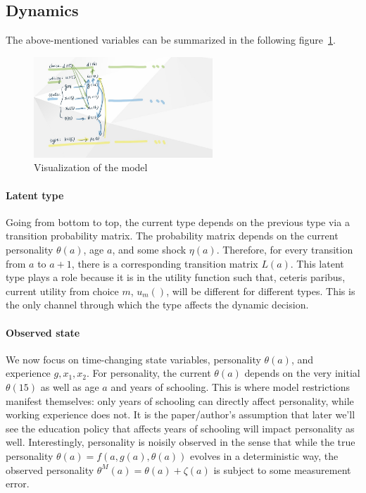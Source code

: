 \documentclass[12pt]{article}
\begin{document}
\subsection{Dynamics}
The above-mentioned variables can be summarized in the following figure~\ref{fig:viz}.

\begin{figure}[!htbp]
\centering
\includegraphics[width=0.6\textwidth]{../Figures/viz.jpg}
\caption{Visualization of the model}
\label{fig:viz}
\end{figure}

\paragraph{Latent type} Going from bottom to top, the current type depends on the previous type via a transition probability matrix. The probability matrix depends on the current personality $\theta(a)$, age $a$, and some shock $\eta(a)$. Therefore, for every transition from $a$ to $a+1$, there is a corresponding transition matrix $L(a)$. This latent type plays a role because it is in the utility function such that, ceteris paribus, current utility from choice $m$, $u_m()$, will be different for different types. This is the only channel through which the type affects the dynamic decision.

\paragraph{Observed state} We now focus on time-changing state variables, personality $\theta(a)$, and experience $g, x_1, x_2$. For personality, the current $\theta(a)$ depends on the very initial $\theta(15)$ as well as age $a$ and years of schooling. This is where model restrictions manifest themselves: only years of schooling can directly affect personality, while working experience does not. It is the paper/author's assumption that later we'll see the education policy that affects years of schooling will impact personality as well. Interestingly, personality is noisily observed in the sense that while the true personality $\theta(a) = f(a, g(a), \theta(a))$ evolves in a deterministic way, the observed personality $\theta^M(a) = \theta(a) + \zeta(a)$ is subject to some measurement error.
\end{document}
